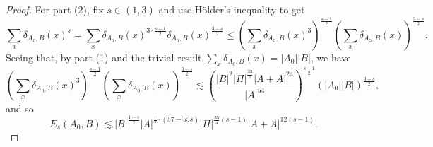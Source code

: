 \documentclass[10pt,a4paper]{amsart}
\newcommand{\holder}{H\"older}
\begin{document}
\begin{proof}
For part (2), fix \(s \in (1,3)\) and use \holder's inequality to get
\[
    \sum _{x} \delta_{A_0,B} (x)^{s} = \sum _{x} \delta_{A_0,B} (x) ^{3 \cdot \frac{s-1}{2}  } \delta_{A_0,B} (x) ^{\frac{3- s }{2} } \leq \left( \sum _{x} \delta_{A_0,B} (x)^{3}  \right) ^{\frac{s-1}{2} } \left( \sum _{x} \delta_{A_0,B} (x) \right) ^{\frac{3-s}{2} }
.\]
Seeing that, by part (1) and the trivial result \( \sum _{x} \delta_{A_0,B} (x) = \left\lvert A_0 \right\rvert \left\lvert B \right\rvert \),
we have
\[
    \left( \sum _{x} \delta_{A_0,B} (x)^{3}  \right) ^{\frac{s-1}{2} } \left( \sum _{x} \delta_{A_0,B} (x) \right) ^{\frac{3-s}{2} } \lesssim \left( \frac{\left\lvert B \right\rvert^{2}  \left\lvert \Pi \right\rvert ^{\frac{35}{2} } \left\lvert A+A \right\rvert ^{24}}{\left\lvert A \right\rvert ^{54}}  \right) ^{\frac{s-1}{2} }\left( \left\lvert A_0 \right\rvert \left\lvert B \right\rvert  \right) ^{\frac{3-s}{2} }
,\]
and so
\[
    E_{s} (A_0,B) \lesssim \left\lvert B \right\rvert ^{\frac{1 + s}{2} } \left\lvert A \right\rvert ^{\frac{1}{2} \cdot \left( 57 - 55s \right) } \left\lvert \Pi \right\rvert ^{\frac{35}{4} (s-1)} \left\lvert A+A \right\rvert ^{12 \left( s-1 \right) }
.\]

\end{proof}
\end{document}
